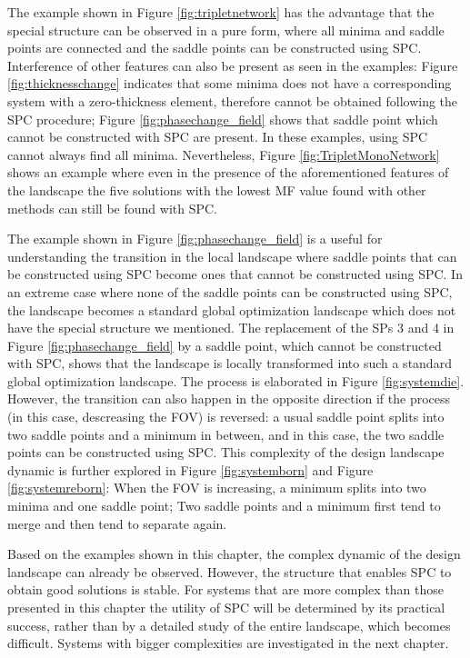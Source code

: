 The example shown in Figure \ref{fig:tripletnetwork} has the advantage that the special structure can be observed in a pure form, where all minima and saddle points are connected and the saddle points can be constructed using SPC. Interference of other features can also be present as seen in the examples: Figure \ref{fig:thicknesschange} indicates that some minima does not have a corresponding system with a zero-thickness element, therefore cannot be obtained following the SPC procedure; Figure \ref{fig:phasechange_field} shows that saddle point which cannot be constructed with SPC are present. In these examples, using SPC cannot always find all minima. Nevertheless, Figure \ref{fig:TripletMonoNetwork} shows an example where even in the presence of the aforementioned features of the landscape the five solutions with the lowest MF value found with other methods can still be found with SPC.

The example shown in Figure \ref{fig:phasechange_field} is a useful for understanding the transition in the local landscape where saddle points that can be constructed using SPC become ones that cannot be constructed using SPC. In an extreme case where none of the saddle points can be constructed using SPC, the landscape becomes a standard global optimization landscape which does not have the special structure we mentioned. The replacement of the SPs 3 and 4 in Figure \ref{fig:phasechange_field} by a saddle point, which cannot be constructed with SPC, shows that the landscape is locally transformed into such a standard global optimization landscape. The process is elaborated in Figure \ref{fig:systemdie}. However, the transition can also happen in the opposite direction if the process (in this case, descreasing the FOV) is reversed: a usual saddle point splits into two saddle points and a minimum in between, and in this case, the two saddle points can be constructed using SPC. This complexity of the design landscape dynamic is further explored in Figure \ref{fig:systemborn} and Figure \ref{fig:systemreborn}: When the FOV is increasing, a minimum splits into two minima and one saddle point; Two saddle points and a minimum first tend to merge and then tend to separate again. 

Based on the examples shown in this chapter, the complex dynamic of the design landscape can already be observed. However, the structure that enables SPC to obtain good solutions is stable. For systems that are more complex than those presented in this chapter the utility of SPC will be determined by its practical success, rather than by a detailed study of the entire landscape, which becomes difficult. Systems with bigger complexities are investigated in the next chapter. 

